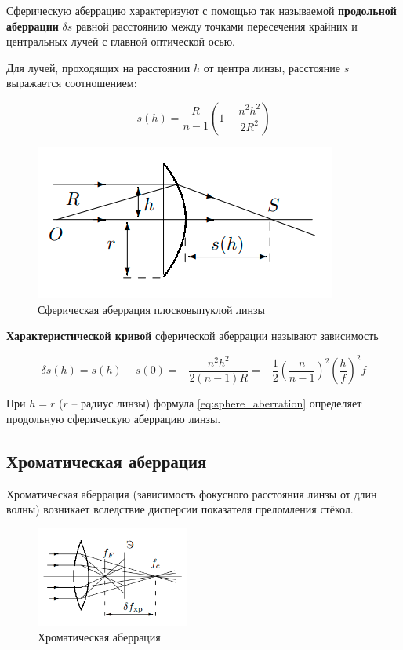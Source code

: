 	Сферическую аберрацию характеризуют с помощью так называемой \textbf{продольной аберрации} $\delta s$ равной расстоянию между точками пересечения крайних и центральных лучей с главной оптической осью.
	
	Для лучей, проходящих на расстоянии $h$ от центра линзы, расстояние $s$ выражается соотношением:
	
	\begin{equation}
		s(h) = \frac{R}{n - 1} \left(1 - \frac{n^2 h^2}{2 R^2} \right)
	\end{equation}

	\begin{figure}
		\centering
		\includegraphics[scale=0.5]{images/aberation_equation.png}
		\caption{Сферическая аберрация плосковыпуклой линзы}
		\label{fig:aberration_equation}
	\end{figure}

	\textbf{Характеристической кривой} сферической аберрации называют зависимость
	
	\begin{equation} \label{eq:sphere_aberration}
		\delta s(h) = s(h) - s(0) = - \frac{n^2 h^2}{2(n - 1) R} = - \frac{1}{2} \left( \frac{n}{n - 1} \right)^2 \left( \frac{h}{f} \right)^2 f
	\end{equation}
	
	При $h = r$ ($r$ -- радиус линзы) формула \eqref{eq:sphere_aberration} определяет продольную сферическую аберрацию линзы.
	
	\subsection*{Хроматическая аберрация}
	
	Хроматическая аберрация (зависимость фокусного расстояния линзы от длин волны) возникает вследствие дисперсии показателя преломления стёкол.
	
	\begin{figure}
		\includegraphics[width = 0.45\textwidth]{images/Chromatic_aberration.png}
		\caption{Хроматическая аберрация}
		\label{Chromatic_aberration}
	\end{figure}

